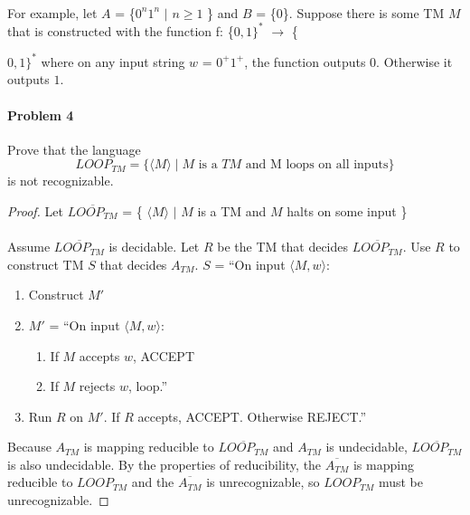 \documentclass{article}
\begin{document}
\paragraph{}For example, let $A$ = \{$0^n1^n$ $|$ $n\geq 1$ \} and $B$ = \{0\}. Suppose there is some TM $M$ that is constructed with the function f: \{$0, 1\}^*$ $\rightarrow$ \{{$0, 1\}^*$ where on any input string $w$ = $0^+1^+$, the function outputs $0$. Otherwise it outputs $1$.


\paragraph{Problem 4} Prove that the language
\[LOOP_{TM} = \{ \langle M \rangle \;|\; M \mbox{ is a $TM$ and M loops on all inputs}\} \]
is not recognizable.

\begin{proof}

Let $\overline{LOOP_{TM}}$ = \{ $ \langle M \rangle $ $|$ $M$ is a TM and $M$ halts on some input \}

\paragraph{} Assume $\overline{LOOP_{TM}}$ is decidable. Let $R$ be the TM that decides $\overline{LOOP_{TM}}$. Use $R$ to construct TM $S$ that decides  $A_{TM}$.
\vspace{3mm} %
 $S$ = ``On input $\langle M, w \rangle$:
\begin{enumerate}
\item Construct $M'$
\item $M'$ = ``On input $\langle M, w \rangle$:
\begin{enumerate}[1.]
\item If $M$ accepts $w$, ACCEPT
\item If $M$ rejects $w$, loop.''
\end{enumerate}
\item Run $R$ on $M'$.  If $R$ accepts, ACCEPT. Otherwise REJECT.'' 
\end{enumerate}

\vspace{3mm} %
 Because $A_{TM}$ is mapping reducible to $\overline{LOOP_{TM}}$ and $A_{TM}$ is undecidable, $\overline{LOOP_{TM}}$ is also undecidable. By the properties of reducibility, the $\overline{A_{TM}}$ is mapping reducible to ${LOOP_{TM}}$ and the $\overline{A_{TM}}$ is unrecognizable, so ${LOOP_{TM}}$ must be unrecognizable.  







\end{proof}}
\end{document}
